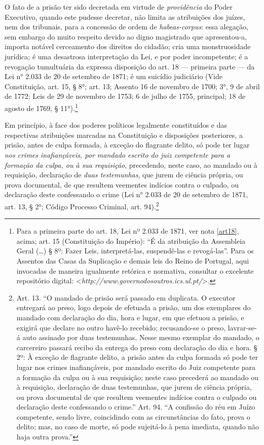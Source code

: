 O fato de a prisão ter sido decretada em virtude de \emph{providência}
do Poder Executivo, quando este pudesse decretar, não limita as
atribuições dos juízes, nem dos tribunais, para a concessão de ordem de
\emph{habeas-corpus}: essa alegação, sem embargo do muito respeito
devido ao digno magistrado que apresentou-a, importa notável cerceamento
dos direitos do cidadão; cria uma monstruosidade jurídica; é uma
desastrosa interpretação da Lei, e por poder incompetente; é a revogação
tumultuária da expressa disposição do art. 18 --- primeira parte --- da
Lei n° 2.033 de 20 de setembro de 1871; é um suicídio judiciário
(Vide Constituição, art. 15, § 8°; art. 13; Assento 16
de novembro de 1700; 3°, 9 de abril de 1772; Leis de 29 de novembro de
1753; 6 de julho de 1755, principal; 18 de agosto de 1769, §
11°).\footnote{Para a primeira parte do art. 18, Lei nº 2.033 de 1871,
  ver nota \ref{art18}, acima; art. 15 (Constituição do Império): ``É da atribuição da
  Assembleia Geral (\ldots{}) § 8º: Fazer Leis, interpretá-las, suspendê-las \label{art15}
  e revogá-las''. Para os Assentos das Casas da Suplicação e demais leis
  do Reino de Portugal, aqui invocadas de maneira igualmente retórica e
  normativa, consultar o excelente repositório digital:
  \textless{}\emph{http://www.governodosoutros.ics.ul.pt/}\textgreater{}.}

\asterisc

Em princípio, à face dos poderes políticos legalmente constituídos e das
respectivas atribuições marcadas na Constituição e disposições
posteriores, a prisão, antes de culpa formada, à exceção do flagrante
delito, só pode ter lugar \emph{nos crimes inafiançáveis, por mandado
escrito do juiz competente para a formação da culpa, ou à sua
requisição}, precedendo, neste caso, ao mandado ou à requisição,
declaração de \emph{duas testemunhas}, que jurem de ciência própria, ou
prova documental, de que resultem veementes indícios contra o culpado,
ou declaração deste confessando o crime (Lei n° 2.033 de 20 de setembro
de 1871, art. 13, § 2°; Código Processo Criminal, art.
94).\footnote{Art. 13. ``O mandado de prisão será passado em \label{art13}
  duplicata. O executor entregará ao preso, logo depois de efetuada a
  prisão, um dos exemplares do mandado com declaração do dia, hora e
  lugar, em que efetuou a prisão, e exigirá que declare no outro havê-lo
  recebido; recusando-se o preso, lavrar-se-á auto assinado por duas
  testemunhas. Nesse mesmo exemplar do mandado, o carcereiro passará
  recibo da entrega do preso com declaração do dia e hora. § 2º: À
  exceção de flagrante delito, a prisão antes da culpa formada só pode
  ter lugar nos crimes inafiançáveis, por mandado escrito do Juiz
  competente para a formação da culpa ou à sua requisição; neste caso
  precederá ao mandado ou à requisição, declaração de duas testemunhas,
  que jurem de ciência própria, ou prova documental de que resultem
  veementes indícios contra o culpado ou declaração deste confessando o
  crime.'' Art. 94. ``A confissão do réu em Juízo competente, sendo
  livre, coincidindo com as circunstâncias do fato, prova o delito; mas,
  no caso de morte, só pode sujeitá-lo à pena imediata, quando não haja
  outra prova.''}

